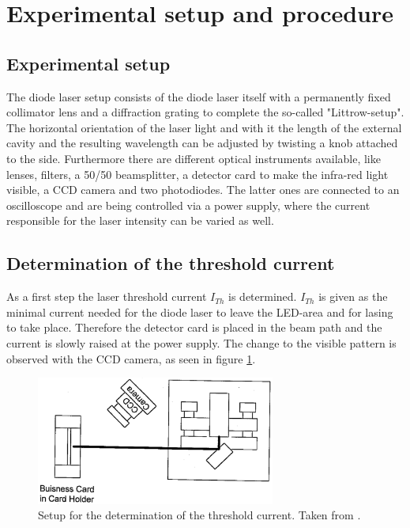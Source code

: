 \newpage
\section{Experimental setup and procedure}
    \subsection{Experimental setup}
        The diode laser setup consists of the diode laser itself
        with a permanently fixed collimator lens and a diffraction grating
        to complete the so-called "Littrow-setup".
        The horizontal orientation of the laser light and with it the length of the external cavity
        and the resulting wavelength can be adjusted by twisting a knob attached to the side.
        Furthermore there are different optical instruments available,
        like lenses, filters, a 50/50 beamsplitter,
        a detector card to make the infra-red light visible,
        a CCD camera and two photodiodes.
        The latter ones are connected to an oscilloscope and are being controlled
        via a power supply, where the current responsible for the laser intensity
        can be varied as well.
        \subsection{Determination of the threshold current}
            As a first step the laser threshold current $I_{Th}$ is determined.
            $I_{Th}$ is given as the minimal current needed for the diode laser
            to leave the LED-area and for lasing to take place.
            Therefore the detector card is placed in the beam path
            and the current is slowly raised at the power supply.
            The change to the visible pattern is observed with the CCD camera,
            as seen in figure \ref{fig:Aufbau1}.
            \begin{figure}[h]
                \centering
                \includegraphics[width = 0.7\textwidth]{pictures/Aufbau1.png}
                \caption{Setup for the determination of the threshold current. Taken from \cite{tu_dortmund_versuchsanleitung_2022-1}.}
                \label{fig:Aufbau1}
            \end{figure}
